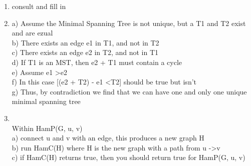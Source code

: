 \documentclass[11pt]{article}
\begin{document}
\begin{enumerate}
\item
    consult and fill in

\item
            \tab a) Assume the Minimal Spanning Tree is not unique, but a T1 and T2 exist and are ezual \\
            \tab b) There exists an edge e1 in T1, and not in T2 \\
            \tab c) There exists an edge e2 in T2, and not in T1 \\
            \tab d) If T1 is an MST, then e2 + T1 must contain a cycle \\
            \tab e) Assume e1 \textgreater  e2 \\
            \tab f) In this case [(e2 + T2) - e1 \textless  T2] should be true but isn't \\
            \tab g) Thus, by contradiction we find that we can have one and only one unique minimal spanning tree \\

\item \\
    \tab Within HamP(G, u, v)\\
    \tab a) connect u and v with an edge, this produces a new graph H\\
    \tab b) run HamC(H) where H is the new graph with a path from u -\textgreater v\\
    \tab c) if HamC(H) returns true, then you should return true for HamP(G, u, v)\\
\end{enumerate}
\end{document}
